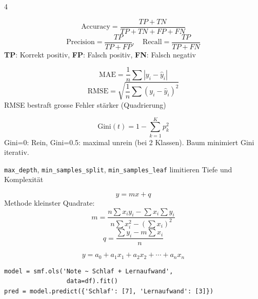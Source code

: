 \begin{landscape}
\begin{multicols*}{4}
		\begin{cheatSheetBox}[title=Klassifikation-Metriken]
			\[
				\text{Accuracy} = \frac{TP + TN}{TP+TN+FP+FN}
			\]
			\[
				\text{Precision} = \frac{TP}{TP+FP}, \quad
				\text{Recall} = \frac{TP}{TP+FN}
			\]
			\textbf{TP}: Korrekt positiv, \textbf{FP}: Falsch positiv, \textbf{FN}: Falsch negativ
		\end{cheatSheetBox}

		\begin{cheatSheetBox}[title=Regression-Metriken]
			\[
				\text{MAE} = \frac{1}{n}\sum|y_i - \hat{y}_i|
			\]
			\[
				\text{RMSE} = \sqrt{\frac{1}{n}\sum(y_i - \hat{y}_i)^2}
			\]
			RMSE bestraft grosse Fehler stärker (Quadrierung)
		\end{cheatSheetBox}


		\begin{cheatSheetBox}[title=Gini-Reinheitsmass]
			\[
				\text{Gini}(t) = 1 - \sum_{k=1}^{K} p_k^2
			\]
			Gini=0: Rein, Gini=0.5: maximal unrein (bei 2 Klassen). Baum minimiert Gini iterativ.
		\end{cheatSheetBox}

		\begin{cheatSheetBox}[title=Overfitting-Prävention]
			\texttt{max\_depth}, \texttt{min\_samples\_split}, \texttt{min\_samples\_leaf} limitieren Tiefe und Komplexität
		\end{cheatSheetBox}


		\begin{cheatSheetBox}[title=Einfache lineare Regression]
			\[y = mx + q\]
			Methode kleinster Quadrate:
			\[
				m = \frac{n\sum x_i y_i - \sum x_i \sum y_i}{n\sum x_i^2 - (\sum x_i)^2}
			\]
			\[
				q = \frac{\sum y_i - m\sum x_i}{n}
			\]
		\end{cheatSheetBox}

		\begin{cheatSheetBox}[title=Multiple lineare Regression]
			\[
				y = a_0 + a_1 x_1 + a_2 x_2 + \cdots + a_n x_n
			\]
			\begin{lstlisting}
model = smf.ols('Note ~ Schlaf + Lernaufwand',
                 data=df).fit()
pred = model.predict({'Schlaf': [7], 'Lernaufwand': [3]})
			\end{lstlisting}
		\end{cheatSheetBox}


\end{multicols*}
\end{landscape}
